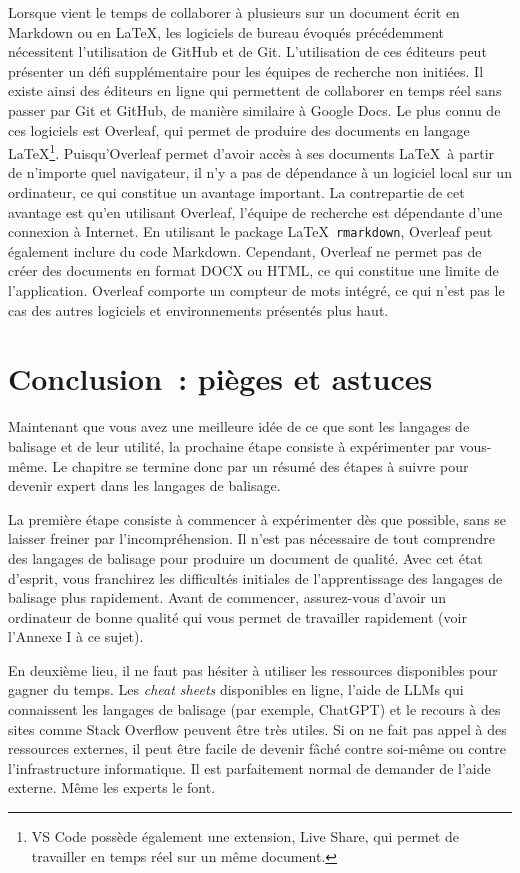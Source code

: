 \documentclass[
  letterpaper,
  DIV=11,
  numbers=noendperiod]{scrreprt}
\begin{document}
Lorsque vient le temps de collaborer à plusieurs sur un document écrit
en Markdown ou en \LaTeX, les logiciels de bureau évoqués précédemment
nécessitent l'utilisation de GitHub et de Git. L'utilisation de ces
éditeurs peut présenter un défi supplémentaire pour les équipes de
recherche non initiées. Il existe ainsi des éditeurs en ligne qui
permettent de collaborer en temps réel sans passer par Git et GitHub, de
manière similaire à Google Docs. Le plus connu de ces logiciels est
Overleaf, qui permet de produire des documents en langage
\LaTeX\footnote{VS Code possède également une extension, Live Share, qui
  permet de travailler en temps réel sur un même document.}.
Puisqu'Overleaf permet d'avoir accès à ses documents \LaTeX~à partir de
n'importe quel navigateur, il n'y a pas de dépendance à un logiciel
local sur un ordinateur, ce qui constitue un avantage important. La
contrepartie de cet avantage est qu'en utilisant Overleaf, l'équipe de
recherche est dépendante d'une connexion à Internet. En utilisant le
package \LaTeX~\texttt{rmarkdown}, Overleaf peut également inclure du
code Markdown. Cependant, Overleaf ne permet pas de créer des documents
en format DOCX ou HTML, ce qui constitue une limite de l'application.
Overleaf comporte un compteur de mots intégré, ce qui n'est pas le cas
des autres logiciels et environnements présentés plus haut.

\section{Conclusion~: pièges et
astuces}\label{conclusion-piuxe8ges-et-astuces}

Maintenant que vous avez une meilleure idée de ce que sont les langages
de balisage et de leur utilité, la prochaine étape consiste à
expérimenter par vous-même. Le chapitre se termine donc par un résumé
des étapes à suivre pour devenir expert dans les langages de balisage.

La première étape consiste à commencer à expérimenter dès que possible,
sans se laisser freiner par l'incompréhension. Il n'est pas nécessaire
de tout comprendre des langages de balisage pour produire un document de
qualité. Avec cet état d'esprit, vous franchirez les difficultés
initiales de l'apprentissage des langages de balisage plus rapidement.
Avant de commencer, assurez-vous d'avoir un ordinateur de bonne qualité
qui vous permet de travailler rapidement (voir l'Annexe I à ce sujet).

En deuxième lieu, il ne faut pas hésiter à utiliser les ressources
disponibles pour gagner du temps. Les \emph{cheat sheets} disponibles en
ligne, l'aide de LLMs qui connaissent les langages de balisage (par
exemple, ChatGPT) et le recours à des sites comme Stack Overflow peuvent
être très utiles. Si on ne fait pas appel à des ressources externes, il
peut être facile de devenir fâché contre soi-même ou contre
l'infrastructure informatique. Il est parfaitement normal de demander de
l'aide externe. Même les experts le font.
\end{document}
